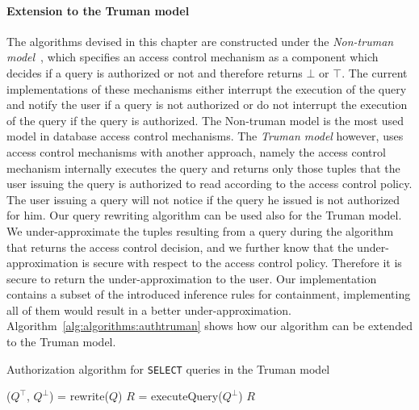 \paragraph{Extension to the Truman model}

The algorithms devised in this chapter are constructed under the \emph{Non-truman model}~\cite{rizvi2004extending}, which specifies an access control mechanism as a component which decides if a query is authorized or not and therefore returns $\bot$ or $\top$.
%
The current implementations of these mechanisms either interrupt the execution of the query and notify the user if a query is not authorized or do not interrupt the execution of the query if the query is authorized.
%
The Non-truman model is the most used model in database access control mechanisms.
%
The \emph{Truman model} however, uses access control mechanisms with another approach, namely the access control mechanism internally executes the query and returns only those tuples that the user issuing the query is authorized to read according to the access control policy.
%
The user issuing a query will not notice if the query he issued is not authorized for him.
%
Our query rewriting algorithm can be used also for the Truman model.
%
We under-approximate the tuples resulting from a query during the algorithm that returns the access control decision, and we further know that the under-approximation is secure with respect to the access control policy.
%
Therefore it is secure to return the under-approximation to the user.
%
Our implementation contains a subset of the introduced inference rules for containment, implementing all of them would result in a better under-approximation. 
%
Algorithm~\ref{alg:algorithms:authtruman} shows how our algorithm can be extended to the Truman model.
%
\begin{algorithm}
\caption{Authorization algorithm for \texttt{SELECT} queries in the Truman model}
\label{alg:algorithms:authtruman}
	\SetAlgoLined
	($Q^\top$, $Q^\bot$) = rewrite($Q$)\;
	$R$ = executeQuery($Q^\bot$)\;
	\Return $R$

\end{algorithm}
